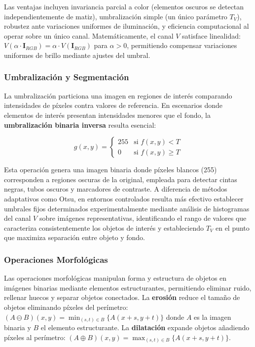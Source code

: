 Las ventajas incluyen invariancia parcial a color (elementos oscuros se detectan independientemente de matiz), umbralización simple (un único parámetro $T_V$), robustez ante variaciones uniformes de iluminación, y eficiencia computacional al operar sobre un único canal. Matemáticamente, el canal $V$ satisface linealidad: $V(\alpha \cdot \mathbf{I}_{RGB}) = \alpha \cdot V(\mathbf{I}_{RGB})$ para $\alpha > 0$, permitiendo compensar variaciones uniformes de brillo mediante ajustes del umbral.

\subsubsection{Umbralización y Segmentación}

La umbralización particiona una imagen en regiones de interés comparando intensidades de píxeles contra valores de referencia. En escenarios donde elementos de interés presentan intensidades menores que el fondo, la \textbf{umbralización binaria inversa} resulta esencial:

\begin{equation}
g(x,y) = \begin{cases}
255 & \text{si } f(x,y) < T \\
0 & \text{si } f(x,y) \geq T
\end{cases}
\end{equation}

Esta operación genera una imagen binaria donde píxeles blancos (255) corresponden a regiones oscuras de la original, empleada para detectar cintas negras, tubos oscuros y marcadores de contraste. A diferencia de métodos adaptativos como Otsu, en entornos controlados resulta más efectivo establecer umbrales fijos determinados experimentalmente mediante análisis de histogramas del canal $V$ sobre imágenes representativas, identificando el rango de valores que caracteriza consistentemente los objetos de interés y estableciendo $T_V$ en el punto que maximiza separación entre objeto y fondo.

\subsubsection{Operaciones Morfológicas}

Las operaciones morfológicas manipulan forma y estructura de objetos en imágenes binarias mediante elementos estructurantes, permitiendo eliminar ruido, rellenar huecos y separar objetos conectados. La \textbf{erosión} reduce el tamaño de objetos eliminando píxeles del perímetro: $(A \ominus B)(x,y) = \min_{(s,t) \in B} \{A(x+s, y+t)\}$ donde $A$ es la imagen binaria y $B$ el elemento estructurante. La \textbf{dilatación} expande objetos añadiendo píxeles al perímetro: $(A \oplus B)(x,y) = \max_{(s,t) \in B} \{A(x+s, y+t)\}$.

